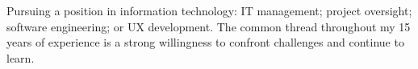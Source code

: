 

\begin{cvparagraph}

Pursuing a position in information technology: IT management; project oversight; software engineering; or UX development. The common thread throughout my 15 years of experience is a strong willingness to confront challenges and continue to learn.
\end{cvparagraph}
